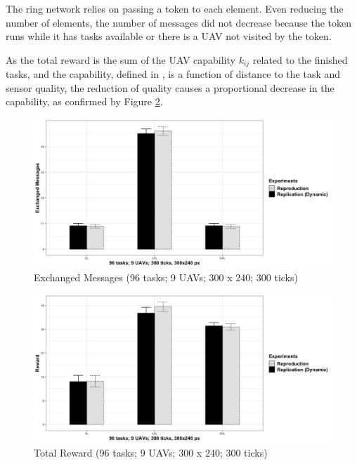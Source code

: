 The ring network relies on passing a token to each element. Even reducing the number of elements, the number of messages did not decrease because the token runs while it has tasks available or there is a UAV not visited by the token.

As the total reward is the sum of the UAV capability $k_{ij}$ related to the finished tasks, and the capability, defined in \cite{MAS07}, is a function of distance to the task and sensor quality, the reduction of quality causes a proportional decrease in the capability, as confirmed by Figure \ref{fig:fig02}.

\begin{figure}[h!]
	\begin{center}
		\includegraphics[scale=0.15]{fig/GRAPH03.png}
		\caption{Exchanged Messages  (96 tasks; 9 UAVs; 300 x 240; 300 ticks)}
		\label{fig:fig01}
	\end{center}
\end{figure}

\begin{figure}[h!]
	\begin{center}
		\includegraphics[scale=0.15]{fig/GRAPH04.png}
		\caption{Total Reward (96 tasks; 9 UAVs; 300 x 240; 300 ticks)}
		\label{fig:fig02}
	\end{center}
\end{figure}

